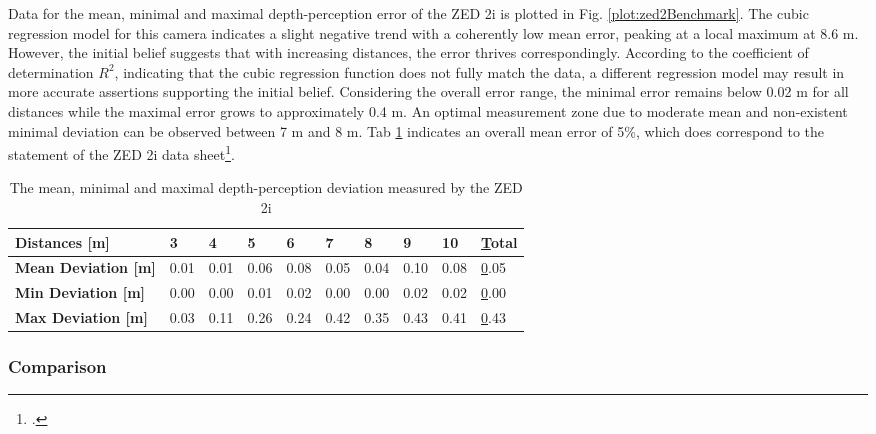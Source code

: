 Data for the mean, minimal and maximal depth-perception error of the ZED 2i is plotted in Fig. \ref{plot:zed2Benchmark}.
The cubic regression model for this camera indicates a slight negative trend with a coherently low mean error, peaking at a local maximum at 8.6 m. However, the initial belief suggests that with increasing distances, the error thrives correspondingly. According to the coefficient of determination $R^{2}$, indicating that the cubic regression function does not fully match the data, a different regression model may result in more accurate assertions supporting the initial belief. 
Considering the overall error range, the minimal error remains below 0.02 m for all distances while the maximal error grows to approximately 0.4 m. 
An optimal measurement zone due to moderate mean and non-existent minimal deviation can be observed between 7 m and 8 m. 
Tab \ref{tab:resultsZed2} indicates an overall mean error of 5\%, which does correspond to the statement of the ZED 2i data sheet\footcite{zed2Datasheet}.



\begin{table}[h]
	\centering
	\begin{tabular}{|l|l|l|l|l|l|l|l|l|l|}
		\hline
		\textbf{Distances {[}m{]}}      & 3    & 4    & 5    & 6    & 7    & 8    & 9    & 10   & {\ul Total} \\ \hline
		\textbf{Mean Deviation {[}m{]}} & 0.01 & 0.01 & 0.06 & 0.08 & 0.05 & 0.04 & 0.10 & 0.08 & {\ul 0.05}  \\ \hline
		\textbf{Min Deviation {[}m{]}}  & 0.00 & 0.00 & 0.01 & 0.02 & 0.00 & 0.00 & 0.02 & 0.02 & {\ul 0.00}  \\ \hline
		\textbf{Max Deviation {[}m{]}}  & 0.03 & 0.11 & 0.26 & 0.24 & 0.42 & 0.35 & 0.43 & 0.41 & {\ul 0.43}  \\ \hline
	\end{tabular}
	\caption{The mean, minimal and maximal depth-perception deviation measured by the ZED 2i}
	\label{tab:resultsZed2}
\end{table}




\subsubsection{Comparison}

